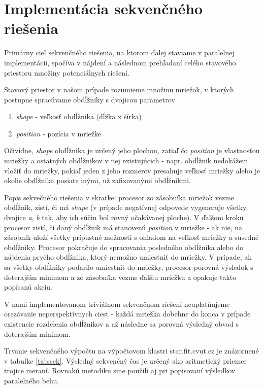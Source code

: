 \documentclass[slovak]{article}
\begin{document}
\section{Implementácia sekvenčného riešenia}

Primárny cieľ sekvenčného riešenia, na ktorom ďalej staviame v paralelnej implementácii, spočíva v nájdení a následnom prehľadaní celého stavového priestoru množiny potenciálnych riešení. 

Stavový priestor v našom prípade rozumieme množinu mriežok, v ktorých postupne spracúvame obdĺžniky s dvojicou parametrov

\begin{enumerate}

\item \emph{shape} - veľkosť obdĺžnika (dĺžka x šírka)

\item \emph{position} - pozícia v mriežke

\end{enumerate}

Očividne, \emph{shape} obdĺžnika je určený jeho plochou, zatiaľ čo \emph{position} je vlastnosťou mriežky a ostatných obdĺžnikov v nej existujúcich - napr. obdĺžnik nedokážem vložiť do mriežky, pokiaľ jeden z jeho rozmerov presahuje veľkosť mriežky alebo je okolie obdĺžnika posiate inými, už zafixovanými obdĺžnikmi.

Popis sekvečného riešenia v skratke: procesor zo zásobníka mriežok vezme obdĺžnik, zistí, či má \emph{shape} (v prípade negatívnej odpovede vygeneruje všetky dvojice \emph{a}, \emph{b} tak, aby ich súčin bol rovný očakávanej ploche). V ďalšom kroku procesor zistí, či daný obdĺžnik má stanovenú \emph{position} v mriežke - ak nie, na zásobník uloží všetky prípustné možnosti s ohľadom na veľkosť mriežky a susedné obdĺžniky. Procesor pokračuje do spracovania posledného obdĺžnika alebo do nájdenia prvého obdĺžnika, ktorý nemožno umiestniť do mriežky. V prípade, ak sa všetky obdĺžniky podarilo umiestniť do mriežky, procesor porovná výsledok s doterajším minimom a zo zásobníka vezme ďalšiu mriežku a opakuje takto popísanú akciu.

V nami implementovanom triviálnom sekvenčnom riešení neuplatňujeme orezávanie neperspektívnych ciest - každá mriežka dobehne do konca v prípade existencie rozdelenia obdĺžnikov a až následne sa porovná výsledný obvod s doterajším minimom.

Trvanie sekvenčného výpočtu na výpočtovom klastri star.fit.cvut.cz je znázornené v tabuľke \ref{tab:sek}. Výsledný sekvenčný čas je určený ako aritmetický priemer trojice meraní. Rovnakú metodiku sme použili aj pri popisovaní výsledkov paralelného behu.
\end{document}
